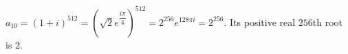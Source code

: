 $a_{10}=(1+i)^{512}=(\sqrt2e^{\dfrac{i\pi}{4}})^{512}=2^{256}e^{128\pi i}=2^{256}$. Its positive real $256$th root is $\boxed2$.
